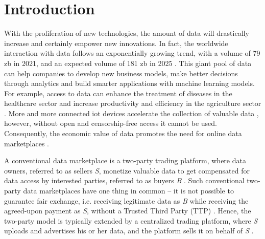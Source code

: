 \chapter{Introduction}
\label{cha:introduction}


With the proliferation of new technologies, the amount of data will drastically increase and certainly empower new innovations. In fact, the worldwide interaction with data follows an exponentially growing trend, with a volume of 79 \acrfull{zb} in 2021, and an expected volume of 181 \acrshort{zb} in 2025 \cite{statistaDataWorldWide}. This giant pool of data can help companies to develop new business models, make better decisions through analytics and build smarter applications with machine learning models. For example, access to data can enhance the treatment of diseases in the healthcare sector \cite{koutsosAgoraPrivacyAwareData,wangBigDataAnalytics2018,suBDTFBlockchainBasedData2020} and increase productivity and efficiency in the agriculture sector \cite{elijahOverviewInternetThings2018}. More and more connected \acrfull{iot} devices accelerate the collection of valuable data \cite{ozyilmazIDMoBIoTData2018,lawrenzBlockchainTechnologyApproach2019}, however, without open and censorship-free access it cannot be used. Consequently, the economic value of data promotes the need for online data marketplaces \cite{dagevilleSnowflakeElasticData2016,krishnamachariI3IoTMarketplace2018}.

A conventional data marketplace is a two-party trading platform, where data owners, referred to as sellers \emph{S}, monetize valuable data to get compensated for data access by interested parties, referred to as buyers \emph{B} \cite{banerjeeBlockchainEnabledData2019}. Such conventional two-party data marketplaces have one thing in common -- it is not possible to guarantee fair exchange, i.e. receiving legitimate data as \emph{B} while receiving the agreed-upon payment as \emph{S}, without a Trusted Third Party (TTP) \cite{banerjeeBlockchainEnabledData2019}. Hence, the two-party model is typically extended by a centralized trading platform, where \emph{S} uploads and advertises his or her data, and the platform sells it on behalf of \emph{S} \cite{banerjeeBlockchainEnabledData2019,daiSDTESecureBlockchainBased2020,suBDTFBlockchainBasedData2020}.

